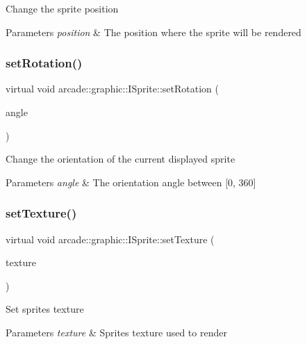 Change the sprite position 
\begin{DoxyParams}{Parameters}
{\em position} & The position where the sprite will be rendered \\
\hline
\end{DoxyParams}
\mbox{\label{classarcade_1_1graphic_1_1_i_sprite_a8290c8345bc4ab3d3a20a7539bf3808e}} 
\subsubsection{\texorpdfstring{setRotation()}{setRotation()}}
{\footnotesize\ttfamily virtual void arcade\+::graphic\+::\+I\+Sprite\+::set\+Rotation (\begin{DoxyParamCaption}\item[{float}]{angle }\end{DoxyParamCaption})\hspace{0.3cm}{\ttfamily [pure virtual]}}

Change the orientation of the current displayed sprite 
\begin{DoxyParams}{Parameters}
{\em angle} & The orientation angle between \mbox{[}0, 360\mbox{]} \\
\hline
\end{DoxyParams}
\mbox{\label{classarcade_1_1graphic_1_1_i_sprite_ad8b153b29798676f0ff3895713e11e1a}} 
\subsubsection{\texorpdfstring{setTexture()}{setTexture()}}
{\footnotesize\ttfamily virtual void arcade\+::graphic\+::\+I\+Sprite\+::set\+Texture (\begin{DoxyParamCaption}\item[{Texture\+Ptr}]{texture }\end{DoxyParamCaption})\hspace{0.3cm}{\ttfamily [pure virtual]}}

Set sprite\textquotesingle{}s texture 
\begin{DoxyParams}{Parameters}
{\em texture} & Sprite\textquotesingle{}s texture used to render \\
\hline
\end{DoxyParams}
\mbox{\label{classarcade_1_1graphic_1_1_i_sprite_a72f62ffd389e825c7791fa034eb8c22e}} 
